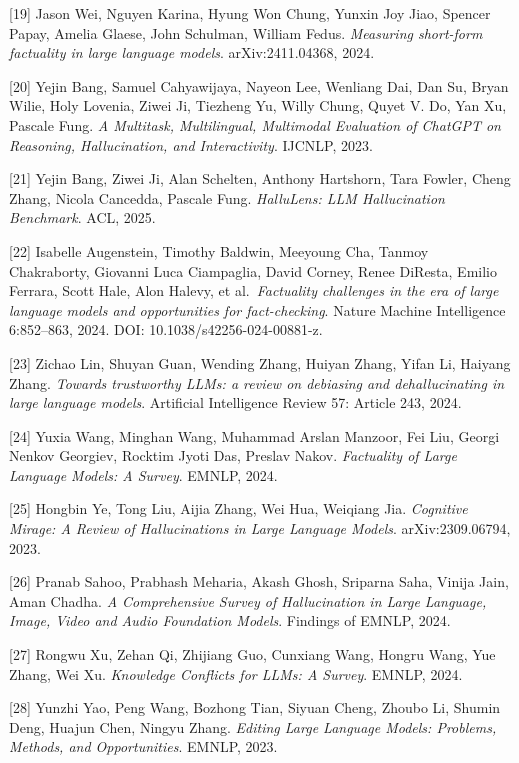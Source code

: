 {[}19{]} Jason Wei, Nguyen Karina, Hyung Won Chung, Yunxin Joy Jiao, Spencer Papay, Amelia Glaese, John Schulman, William Fedus. \emph{Measuring short-form factuality in large language models}. arXiv:2411.04368, 2024.

{[}20{]} Yejin Bang, Samuel Cahyawijaya, Nayeon Lee, Wenliang Dai, Dan Su, Bryan Wilie, Holy Lovenia, Ziwei Ji, Tiezheng Yu, Willy Chung, Quyet V. Do, Yan Xu, Pascale Fung. \emph{A Multitask, Multilingual, Multimodal Evaluation of ChatGPT on Reasoning, Hallucination, and Interactivity}. IJCNLP, 2023.

{[}21{]} Yejin Bang, Ziwei Ji, Alan Schelten, Anthony Hartshorn, Tara Fowler, Cheng Zhang, Nicola Cancedda, Pascale Fung. \emph{HalluLens: LLM Hallucination Benchmark}. ACL, 2025.

{[}22{]} Isabelle Augenstein, Timothy Baldwin, Meeyoung Cha, Tanmoy Chakraborty, Giovanni Luca Ciampaglia, David Corney, Renee DiResta, Emilio Ferrara, Scott Hale, Alon Halevy, et al.~\emph{Factuality challenges in the era of large language models and opportunities for fact-checking}. Nature Machine Intelligence 6:852--863, 2024. DOI: 10.1038/s42256-024-00881-z.

{[}23{]} Zichao Lin, Shuyan Guan, Wending Zhang, Huiyan Zhang, Yifan Li, Haiyang Zhang. \emph{Towards trustworthy LLMs: a review on debiasing and dehallucinating in large language models}. Artificial Intelligence Review 57: Article 243, 2024.

{[}24{]} Yuxia Wang, Minghan Wang, Muhammad Arslan Manzoor, Fei Liu, Georgi Nenkov Georgiev, Rocktim Jyoti Das, Preslav Nakov. \emph{Factuality of Large Language Models: A Survey}. EMNLP, 2024.

{[}25{]} Hongbin Ye, Tong Liu, Aijia Zhang, Wei Hua, Weiqiang Jia. \emph{Cognitive Mirage: A Review of Hallucinations in Large Language Models}. arXiv:2309.06794, 2023.

{[}26{]} Pranab Sahoo, Prabhash Meharia, Akash Ghosh, Sriparna Saha, Vinija Jain, Aman Chadha. \emph{A Comprehensive Survey of Hallucination in Large Language, Image, Video and Audio Foundation Models}. Findings of EMNLP, 2024.

{[}27{]} Rongwu Xu, Zehan Qi, Zhijiang Guo, Cunxiang Wang, Hongru Wang, Yue Zhang, Wei Xu. \emph{Knowledge Conflicts for LLMs: A Survey}. EMNLP, 2024.

{[}28{]} Yunzhi Yao, Peng Wang, Bozhong Tian, Siyuan Cheng, Zhoubo Li, Shumin Deng, Huajun Chen, Ningyu Zhang. \emph{Editing Large Language Models: Problems, Methods, and Opportunities}. EMNLP, 2023.


